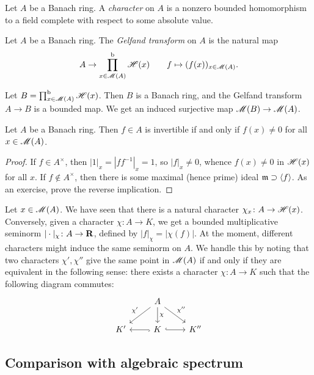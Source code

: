 \begin{definition}
Let $A$ be a Banach ring. A \emph{character} on $A$ is a nonzero bounded 
homomorphism to a field complete with respect to some absolute value. 
\end{definition}

\begin{definition}
Let $A$ be a Banach ring. The \emph{Gelfand transform} on $A$ is the natural 
map 
\[
  A\to \prod^\mathrm{b}_{x\in \operatorname{\mathscr{M}}(A)}  \mathscr{H}(x) \qquad f\mapsto (f(x))_{x\in \operatorname{\mathscr{M}}(A)} .
\]
\end{definition}

Let $B=\prod_{x\in \operatorname{\mathscr{M}}(A)}^\mathrm{b} \mathscr{H}(x)$. Then $B$ is a Banach ring, 
and the Gelfand transform $A\to B$ is a bounded map. We get an induced 
surjective map $\operatorname{\mathscr{M}}(B)\to \operatorname{\mathscr{M}}(A)$. 

\begin{lemma}
Let $A$ be a Banach ring. Then $f\in A$ is invertible if and only if 
$f(x)\ne 0$ for all $x\in \operatorname{\mathscr{M}}(A)$. 
\end{lemma}
\begin{proof}
If $f\in A^\times$, then $|1|_x = |f f^{-1}|_x = 1$, so $|f|_x\ne 0$, whence 
$f(x)\ne 0$ in $\mathscr{H}(x)$ for all $x$. If $f\notin A^\times$, then there is some 
maximal (hence prime) ideal $\mathfrak{m}\supset \langle f\rangle$. As an exercise, 
prove the reverse implication. 
\end{proof}

Let $x\in \operatorname{\mathscr{M}}(A)$. We have seen that there is a natural character 
$\chi_x\colon A\to \mathscr{H}(x)$. Conversely, given a character $\chi\colon A\to K$, 
we get a bounded multiplicative seminorm $|\cdot|_\chi\colon A\to \mathbf{R}$, defined 
by $|f|_\chi = |\chi(f)|$. At the moment, different characters might induce the 
same seminorm on $A$. We handle this by noting that two characters 
$\chi',\chi''$ give the same point in $\operatorname{\mathscr{M}}(A)$ if and only if they are 
equivalent in the following sense: there exists a character $\chi\colon A\to K$ 
such that the following diagram commutes:
\begin{equation}\label{eq:equiv-characters}
\begin{tikzcd}
  & A \ar[dl, swap, "\chi'"] \ar[d, "\chi"] \ar[dr, "\chi''"] \\
  K' 
    & K \ar[l, hook] \ar[r, hook]
    & K''
\end{tikzcd}
\end{equation}


\subsection{Comparison with algebraic spectrum}

